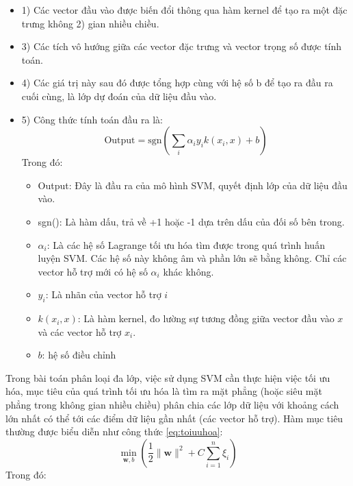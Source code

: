 \documentclass[a4paper]{article}
\begin{document}
\begin{itemize}[label={}]
    \item 1) Các vector đầu vào được biến đổi thông qua hàm kernel để tạo ra một đặc trưng không 2) gian nhiều chiều.
    \item 3) Các tích vô hướng giữa các vector đặc trưng và vector trọng số được tính toán.
    \item 4) Các giá trị này sau đó được tổng hợp cùng với hệ số b để tạo ra đầu ra cuối cùng, là lớp dự đoán của dữ liệu đầu vào.
    \item 5) Công thức tính toán đầu ra là: 
        \begin{equation}
            \text{Output} = \text{sgn}\left(\sum_{i} \alpha_i y_i k(x_i, x) + b\right)
        \end{equation}
    Trong đó:
    \begin{itemize}[label={}]
        \item Output: Đây là đầu ra của mô hình SVM, quyết định lớp của dữ liệu đầu vào.
        \item sgn(): Là hàm dấu, trả về +1 hoặc -1 dựa trên dấu của đối số bên trong.
        \item \textbf{$\alpha_i$}: Là các hệ số Lagrange tối ưu hóa tìm được trong quá trình huấn luyện SVM. Các hệ số này không âm và phần lớn sẽ bằng không. Chỉ các vector hỗ trợ mới có hệ số $\alpha_i$ khác không.
        \item \textbf{$y_i$}: Là nhãn của vector hỗ trợ $i$
        \item \textbf{$k(x_i, x)$}: Là hàm kernel, đo lường sự tương đồng giữa vector đầu vào $x$ và các vector hỗ trợ $x_i$.
        \item \textbf{$b$}: hệ số điều chỉnh
    \end{itemize}
\end{itemize}
Trong bài toán phân loại đa lớp, việc sử dụng SVM cần thực hiện việc tối ưu hóa, mục tiêu của quá trình tối ưu hóa là tìm ra mặt phẳng (hoặc siêu mặt phẳng trong không gian nhiều chiều) phân chia các lớp dữ liệu với khoảng cách lớn nhất có thể tới các điểm dữ liệu gần nhất (các vector hỗ trợ). Hàm mục tiêu thường được biểu diễn như công thức \ref{eq:toiuuhoa}:
\begin{equation}
    \min_{\mathbf{w}, b} \left( \frac{1}{2} \|\mathbf{w}\|^2 + C \sum_{i=1}^n \xi_i \right)
    \label{eq:toiuuhoa}
\end{equation}
Trong đó: 
\end{document}
